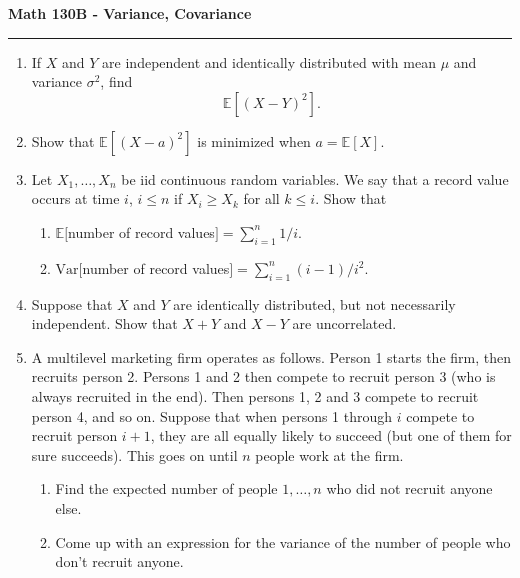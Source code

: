 \documentclass[11pt,letterpaper]{article}
\newcommand{\E}{\mathbb{E}}
\newcommand{\Var}{\text{Var}}
\begin{document}
\begin{center}
{\bf \Large Math 130B - Variance, Covariance}
\vspace{0.2cm}
\hrule
\end{center}

\begin{enumerate}
	\item If $X$ and $Y$ are independent and identically distributed with mean $\mu$ and variance $\sigma^2$, find
	\[
		\E[(X-Y)^2].
	\]

	\vfill

	\item Show that $\E[(X-a)^2]$ is minimized when $a = \E[X]$.

	\vfill

	\item Let $X_1, \ldots, X_n$ be iid continuous random variables. We say that a record value occurs at time $i$, $i\leq n$ if $X_i \geq X_k$ for all $k\leq i$. Show that
	\begin{enumerate}
		\item $\E[$number of record values$] = \sum_{i=1}^n 1/i$.
		\vfill

		\item $\Var[$number of record values$] = \sum_{i=1}^n (i-1)/i^2$.
	\end{enumerate}
	\vfill

	\item Suppose that $X$ and $Y$ are identically distributed, but not necessarily independent. Show that $X+Y$ and $X-Y$ are uncorrelated.

	\vfill

	\item A multilevel marketing firm operates as follows. Person 1 starts the firm, then recruits person 2. Persons 1 and 2 then compete to recruit person 3 (who is always recruited in the end). Then persons 1, 2 and 3 compete to recruit person 4, and so on. Suppose that when persons 1 through $i$ compete to recruit person $i+1$, they are all equally likely to succeed (but one of them for sure succeeds). This goes on until $n$ people work at the firm.
	\begin{enumerate}
		\item Find the expected number of people $1, \ldots, n$ who did not recruit anyone else.

		\vfill

		\item Come up with an expression for the variance of the number of people who don't recruit anyone.
	\end{enumerate}

	\vfill
\end{enumerate}
\end{document}
